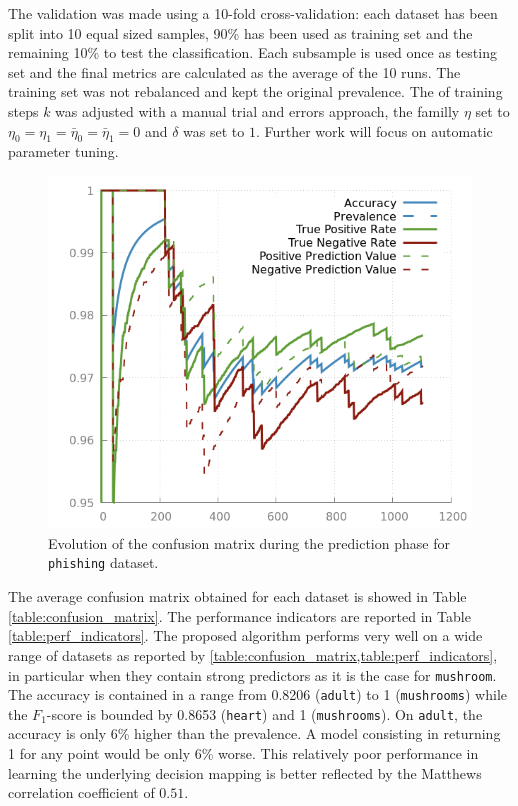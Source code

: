 \documentclass[sigconf,edbt]{acmart-edbt-workshops}
\begin{document}
The validation was made using a 10-fold cross-validation: each dataset has been split into 10 equal sized samples, 90\% has been used as training set and the remaining 10\% to test the classification. Each subsample is used once as testing set and the final metrics are calculated as the average of the 10 runs. The training set was not rebalanced and kept the original prevalence. The of training steps $k$ was adjusted with a manual trial and errors approach, the familly $\eta$ set to $\eta_0 = \eta_1 = \bar \eta_0 = \bar \eta_1 = 0$ and $\delta$ was set to $1$. Further work will focus on automatic parameter tuning. 
\begin{figure}[!h]
\centering
\includegraphics[scale=0.35]{img/output_run_0_confusion_matrix_1.png}
\caption{Evolution of the confusion matrix during the prediction phase for \texttt{phishing} dataset.}
\label{fig:evolution_phishing}
\end{figure}
The average confusion matrix obtained for each dataset is showed in Table \ref{table:confusion_matrix}. The performance indicators are reported in Table \ref{table:perf_indicators}. The proposed algorithm performs very well on a wide range of datasets as reported by \cref{table:confusion_matrix,table:perf_indicators}, in particular when they contain strong predictors as it is the case for \texttt{mushroom}. The accuracy is contained in a range from 0.8206 (\texttt{adult}) to 1 (\texttt{mushrooms}) while the $F_1$-score is bounded by 0.8653 (\texttt{heart}) and 1 (\texttt{mushrooms}). On \texttt{adult}, the accuracy is only 6\% higher than the prevalence. A model consisting in returning 1 for any point would be only 6\% worse. This relatively poor performance in learning the underlying decision mapping is better reflected by the Matthews correlation coefficient of $0.51$.
\end{document}
